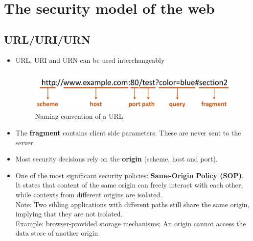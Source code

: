 \documentclass[../main.tex]{subfiles}
\begin{document}
\section{The security model of the web}
\subsection{URL/URI/URN}
\begin{itemize}
\item URL, URI and URN can be used interchangeably
\begin{figure}[h!]
\includegraphics[width=\textwidth]{../images/url}
\caption{Naming convention of a URL}
\end{figure}
\item The \textbf{fragment} contains client side parameters. These are never sent to the server.
\item Most security decisions rely on the \textbf{origin} (scheme, host and port).
\item One of the most significant security policies: \textbf{Same-Origin Policy (SOP)}. It states that content of the same origin can freely interact with each other, while contexts from different origins are isolated.\\
Note: Two sibling applications with different paths still share the same origin, implying that they are not isolated.\\
Example: browser-provided storage mechanisms; An origin cannot access the data store of another origin.
\end{itemize}
\end{document}
